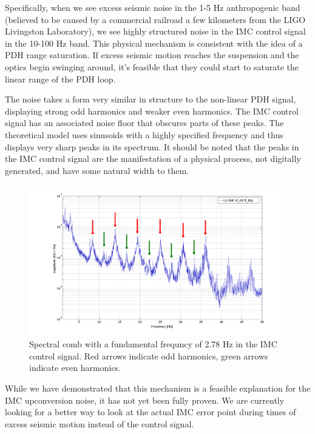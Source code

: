 Specifically, when we see excess seismic noise in the 1-5 Hz anthropogenic band (believed to be caused by a commercial railroad a few kilometers from the LIGO Livingston Laboratory), we see highly structured noise in the IMC control signal in the 10-100 Hz band. This physical mechanism is consistent with the idea of a PDH range saturation. If excess seismic motion reaches the suspension and the optics begin swinging around, it's feasible that they could start to saturate the linear range of the PDH loop.

The noise takes a form very similar in structure to the non-linear PDH signal, displaying strong odd harmonics and weaker even harmonics. The IMC control signal has an associated noise floor that obscures parts of these peaks. The theoretical model uses sinusoids with a highly specified frequency and thus displays very sharp peaks in its spectrum. It should be noted that the peaks in the IMC control signal are the manifestation of a physical process, not digitally generated, and have some natural width to them.

\begin{figure}[h!]
\includegraphics[height=0.6\textwidth]{figures/IMCUpconversion/upconversion_comb.png}
\caption[Spectral comb in IMC control signal]{Spectral comb with a fundamental frequncy of 2.78 Hz in the IMC control signal. Red arrows indicate odd harmonics, green arrows indicate even harmonics. }
\end{figure}

While we have demonstrated that this mechanism is a feasible explanation for the IMC upconversion noise, it has not yet been fully proven. We are currently looking for a better way to look at the actual IMC error point during times of excess seismic motion instead of the control signal. 

